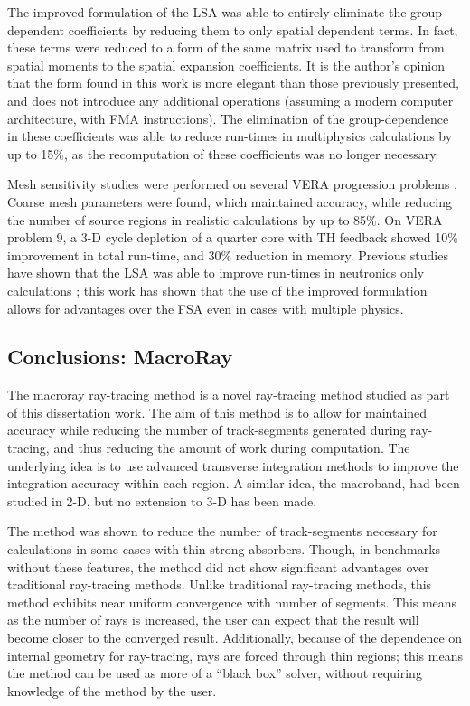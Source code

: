 {{{      The improved formulation of the \ac{LSA} was able to entirely eliminate the group-dependent coefficients by reducing them to only spatial dependent terms.
      In fact, these terms were reduced to a form of the same matrix used to transform from spatial moments to the spatial expansion coefficients.
      It is the author's opinion that the form found in this work is more elegant than those previously presented, and does not introduce any additional operations (assuming a modern computer architecture, with \acf{FMA} instructions).
      The elimination of the group-dependence in these coefficients was able to reduce run-times in multiphysics calculations by up to 15\%, as the recomputation of these coefficients was no longer necessary.

      Mesh sensitivity studies were performed on several \ac{VERA} progression problems \cite{VERAProblems}.
      Coarse mesh parameters were found, which maintained accuracy, while reducing the number of source regions in realistic calculations by up to 85\%.
      On \ac{VERA} problem 9, a 3-D cycle depletion of a quarter core with \ac{TH} feedback showed 10\% improvement in total run-time, and 30\% reduction in memory.
      Previous studies have shown that the \ac{LSA} was able to improve run-times in neutronics only calculations \cite{Ferrer2016,Gunow2018};
      this work has shown that the use of the improved formulation allows for advantages over the \ac{FSA} even in cases with multiple physics.
    }

    \subsection{Conclusions: MacroRay}{\label{ssec:Conclusions:MacroRay}
      The macroray ray-tracing method is a novel ray-tracing method studied as part of this dissertation work.
      The aim of this method is to allow for maintained accuracy while reducing the number of track-segments generated during ray-tracing, and thus reducing the amount of work during computation.
      The underlying idea is to use advanced transverse integration methods to improve the integration accuracy within each region.
      A similar idea, the macroband, had been studied in 2-D, but no extension to 3-D has been made.

      The method was shown to reduce the number of track-segments necessary for calculations in some cases with thin strong absorbers.
      Though, in benchmarks without these features, the method did not show significant advantages over traditional ray-tracing methods.
      Unlike traditional ray-tracing methods, this method exhibits near uniform convergence with number of segments.
      This means as the number of rays is increased, the user can expect that the result will become closer to the converged result.
      Additionally, because of the dependence on internal geometry for ray-tracing, rays are forced through thin regions;
        this means the method can be used as more of a ``black box'' solver, without requiring knowledge of the method by the user.
    }
  }

}
